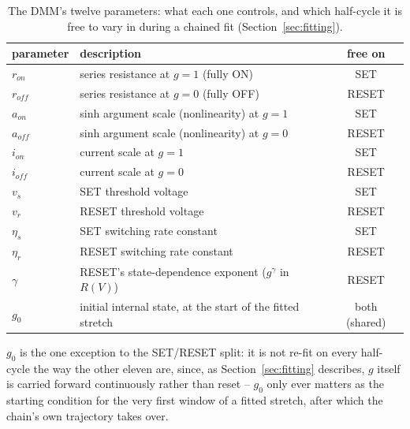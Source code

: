\documentclass[11pt]{article}
\begin{document}
\begin{table}[H]
\centering
\small
\caption{The DMM's twelve parameters: what each one controls, and which
half-cycle it is free to vary in during a chained fit (Section~\ref{sec:fitting}).}
\label{tab:params}
\begin{tabular}{llc}
\toprule
parameter & description & free on \\
\midrule
$r_{on}$    & series resistance at $g=1$ (fully ON)              & SET \\
$r_{off}$   & series resistance at $g=0$ (fully OFF)              & RESET \\
$a_{on}$    & sinh argument scale (nonlinearity) at $g=1$         & SET \\
$a_{off}$   & sinh argument scale (nonlinearity) at $g=0$         & RESET \\
$i_{on}$    & current scale at $g=1$                              & SET \\
$i_{off}$   & current scale at $g=0$                              & RESET \\
$v_s$       & SET threshold voltage                               & SET \\
$v_r$       & RESET threshold voltage                             & RESET \\
$\eta_s$    & SET switching rate constant                         & SET \\
$\eta_r$    & RESET switching rate constant                       & RESET \\
$\gamma$    & RESET's state-dependence exponent ($g^\gamma$ in $R(V)$) & RESET \\
$g_0$       & initial internal state, at the start of the fitted stretch & both (shared) \\
\bottomrule
\end{tabular}
\end{table}

$g_0$ is the one exception to the SET/RESET split: it is not re-fit on
every half-cycle the way the other eleven are, since, as
Section~\ref{sec:fitting} describes, $g$ itself is carried forward
continuously rather than reset -- $g_0$ only ever matters as the starting
condition for the very first window of a fitted stretch, after which the
chain's own trajectory takes over.
\end{document}
